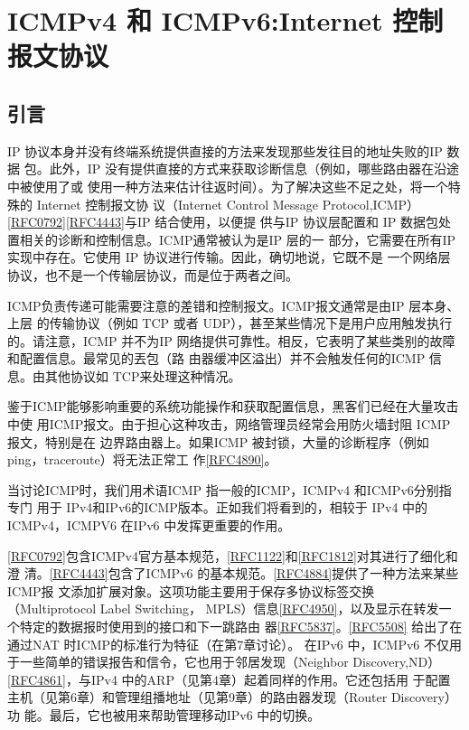 \chapter{ICMPv4 和 ICMPv6:Internet 控制报文协议}
\minitoc
\section{引言}
IP 协议本身并没有终端系统提供直接的方法来发现那些发往目的地址失败的IP 数据
包。此外，IP 没有提供直接的方式来获取诊断信息（例如，哪些路由器在沿途中被使用了或
使用一种方法来估计往返时间）。为了解决这些不足之处，将一个特殊的 Internet 控制报文协
议（Internet Control Message Protocol,ICMP）\href{https://www.rfc-editor.org/rfc/rfc0792}{[RFC0792]}\href{https://www.rfc-editor.org/rfc/rfc4443}{[RFC4443]}与IP 结合使用，以便提
供与IP 协议层配置和 IP 数据包处置相关的诊断和控制信息。ICMP通常被认为是IP 层的一
部分，它需要在所有IP 实现中存在。它使用 IP 协议进行传输。因此，确切地说，它既不是
一个网络层协议，也不是一个传输层协议，而是位于两者之间。

ICMP负责传递可能需要注意的差错和控制报文。ICMP报文通常是由IP 层本身、上层
的传输协议（例如 TCP 或者 UDP），甚至某些情况下是用户应用触发执行的。请注意，ICMP
并不为IP 网络提供可靠性。相反，它表明了某些类别的故障和配置信息。最常见的丟包（路
由器缓冲区溢出）并不会触发任何的ICMP 信息。由其他协议如 TCP来处理这种情况。

鉴于ICMP能够影响重要的系统功能操作和获取配置信息，黑客们已经在大量攻击中使
用ICMP报文。由于担心这种攻击，网络管理员经常会用防火墙封阻 ICMP 报文，特别是在
边界路由器上。如果ICMP 被封锁，大量的诊断程序（例如 ping，traceroute）将无法正常工
作\href{https://www.rfc-editor.org/rfc/rfc4890}{[RFC4890]}。

当讨论ICMP时，我们用术语ICMP 指一般的ICMP，ICMPv4 和ICMPv6分别指专门
用于 IPv4和IPv6的ICMP版本。正如我们将看到的，相较于 IPv4 中的ICMPv4，ICMPV6
在IPv6 中发挥更重要的作用。

\href{https://www.rfc-editor.org/rfc/rfc0792}{[RFC0792]}包含ICMPv4官方基本规范，\href{https://www.rfc-editor.org/rfc/rfc1122}{[RFC1122]}和\href{https://www.rfc-editor.org/rfc/rfc1812}{[RFC1812]}对其进行了细化和澄
清。\href{https://www.rfc-editor.org/rfc/rfc4443}{[RFC4443]}包含了ICMPv6 的基本规范。\href{https://www.rfc-editor.org/rfc/rfc4884}{[RFC4884]}提供了一种方法来某些ICMP报
文添加扩展对象。这项功能主要用于保存多协议标签交换（Multiprotocol Label Switching，
MPLS）信息\href{https://www.rfc-editor.org/rfc/rfc4950}{[RFC4950]}，以及显示在转发一个特定的数据报时使用到的接口和下一跳路由
器\href{https://www.rfc-editor.org/rfc/rfc5837}{[RFC5837]}。\href{https://www.rfc-editor.org/rfc/rfc5508}{[RFC5508]} 给出了在通过NAT 时ICMP的标准行为特征（在第7章讨论）。
在IPv6 中，ICMPv6 不仅用于一些简单的错误报告和信令，它也用于邻居发现（Neighbor
Discovery,ND） \href{https://www.rfc-editor.org/rfc/rfc4861}{[RFC4861]}，与IPv4 中的ARP（见第4章）起着同样的作用。它还包括用
于配置主机（见第6章）和管理组播地址（见第9章）的路由器发现（Router Discovery）功
能。最后，它也被用来帮助管理移动IPv6 中的切换。

